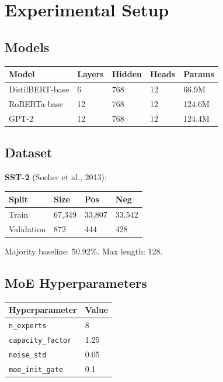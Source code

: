 \section{Experimental Setup}

\subsection{Models}

\begin{table}[H]
\centering
\small
\begin{tabular}{lllll}
\toprule
\textbf{Model} & \textbf{Layers} & \textbf{Hidden} & \textbf{Heads} & \textbf{Params} \\
\midrule
DistilBERT-base & 6 & 768 & 12 & 66.9M \\
RoBERTa-base & 12 & 768 & 12 & 124.6M \\
GPT-2 & 12 & 768 & 12 & 124.4M \\
\bottomrule
\end{tabular}
\end{table}

\subsection{Dataset}

\textbf{SST-2} (Socher et al., 2013):

\begin{table}[H]
\centering
\small
\begin{tabular}{llll}
\toprule
\textbf{Split} & \textbf{Size} & \textbf{Pos} & \textbf{Neg} \\
\midrule
Train & 67,349 & 33,807 & 33,542 \\
Validation & 872 & 444 & 428 \\
\bottomrule
\end{tabular}
\end{table}

Majority baseline: 50.92\%. Max length: 128.

\subsection{MoE Hyperparameters}

\begin{table}[H]
\centering
\small
\begin{tabular}{ll}
\toprule
\textbf{Hyperparameter} & \textbf{Value} \\
\midrule
\texttt{n\_experts} & 8 \\
\texttt{capacity\_factor} & 1.25 \\
\texttt{noise\_std} & 0.05 \\
\texttt{moe\_init\_gate} & 0.1 \\
\bottomrule
\end{tabular}
\end{table}

